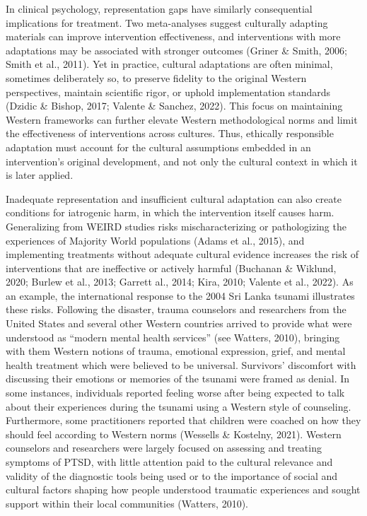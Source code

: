 \documentclass[
  11pt,
]{book}
\begin{document}
In clinical psychology, representation gaps have similarly consequential implications for treatment. Two meta-analyses suggest culturally adapting materials can improve intervention effectiveness, and interventions with more adaptations may be associated with stronger outcomes (Griner \& Smith, 2006; Smith et al., 2011). Yet in practice, cultural adaptations are often minimal, sometimes deliberately so, to preserve fidelity to the original Western perspectives, maintain scientific rigor, or uphold implementation standards (Dzidic \& Bishop, 2017; Valente \& Sanchez, 2022). This focus on maintaining Western frameworks can further elevate Western methodological norms and limit the effectiveness of interventions across cultures. Thus, ethically responsible adaptation must account for the cultural assumptions embedded in an intervention's original development, and not only the cultural context in which it is later applied.

Inadequate representation and insufficient cultural adaptation can also create conditions for iatrogenic harm, in which the intervention itself causes harm. Generalizing from WEIRD studies risks mischaracterizing or pathologizing the experiences of Majority World populations (Adams et al., 2015), and implementing treatments without adequate cultural evidence increases the risk of interventions that are ineffective or actively harmful (Buchanan \& Wiklund, 2020; Burlew et al., 2013; Garrett al., 2014; Kira, 2010; Valente et al., 2022). As an example, the international response to the 2004 Sri Lanka tsunami illustrates these risks. Following the disaster, trauma counselors and researchers from the United States and several other Western countries arrived to provide what were understood as ``modern mental health services'' (see Watters, 2010), bringing with them Western notions of trauma, emotional expression, grief, and mental health treatment which were believed to be universal. Survivors' discomfort with discussing their emotions or memories of the tsunami were framed as denial. In some instances, individuals reported feeling worse after being expected to talk about their experiences during the tsunami using a Western style of counseling. Furthermore, some practitioners reported that children were coached on how they should feel according to Western norms (Wessells \& Kostelny, 2021). Western counselors and researchers were largely focused on assessing and treating symptoms of PTSD, with little attention paid to the cultural relevance and validity of the diagnostic tools being used or to the importance of social and cultural factors shaping how people understood traumatic experiences and sought support within their local communities (Watters, 2010).
\end{document}
